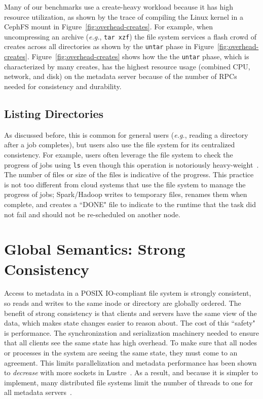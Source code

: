 Many of our benchmarks use a create-heavy workload because it has high resource
utilization, as shown by the trace of compiling the Linux kernel in a CephFS
mount in Figure~\ref{fig:overhead-creates}.  For example, when uncompressing an
archive ({\it e.g.}, \texttt{tar xzf}) the file system services a flash crowd
of creates across all directories as shown by the \texttt{untar} phase in
Figure~\ref{fig:overhead-creates}.  Figure~\ref{fig:overhead-creates} shows how
the the \texttt{untar} phase, which is characterized by many creates, has the
highest resource usage (combined CPU, network, and disk) on the metadata server
because of the number of RPCs needed for consistency and durability.  

\subsection{Listing Directories}
\label{sec:listing-directories}

As discussed before, this is common for general users ({\it e.g.}, reading a
directory after a job completes), but users also use the file system for its
centralized consistency.  For example, users often leverage the file system to
check the progress of jobs using \texttt{ls} even though this operation is
notoriously heavy-weight~\cite{carns:ipdps09-pvfs, eshel:fast10-panache}. The
number of files or size of the files is indicative of the progress. This
practice is not too different from cloud systems that use the file system to
manage the progress of jobs; Spark/Hadoop writes to temporary files, renames
them when complete, and creates a ``DONE" file to indicate to the runtime that
the task did not fail and should not be re-scheduled on another node.

\section{Global Semantics: Strong Consistency}

Access to metadata in a POSIX IO-compliant file system is strongly consistent,
so reads and writes to the same inode or directory are globally ordered.  The
benefit of strong consistency is that clients and servers have the same view of
the data, which makes state changes easier to reason about.  The cost of this
``safety" is performance.  The synchronization and serialization machinery
needed to ensure that all clients see the same state has high overhead.  To
make sure that all nodes or processes in the system are seeing the same state,
they must come to an agreement.  This limits parallelization and metadata
performance has been shown to {\it decrease} with more sockets in
Lustre~\cite{konstantinos:pdsw2014-lustre-metadata}. As a result, and because
it is simpler to implement, many distributed file systems limit the number of
threads to one for all metadata servers~\cite{weil:osdi2006-ceph,
alam:pdsw2011-metadata-scaling, ren:sc2014-indexfs}. 

